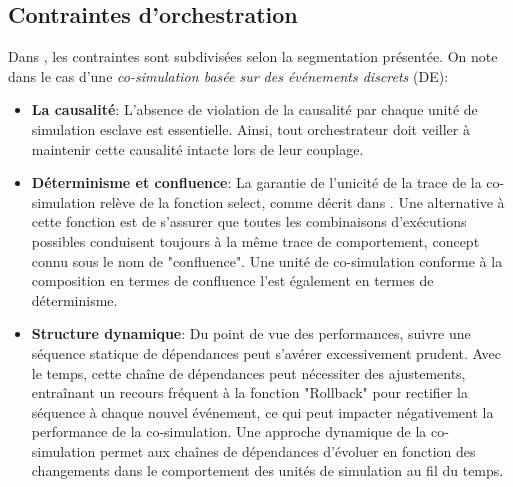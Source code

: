 \subsection{Contraintes d'orchestration}
Dans \cite{b7}, les contraintes sont subdivisées selon la segmentation présentée. On note dans le cas d'une \textit{co-simulation basée sur des événements discrets} (DE): 
\begin{itemize}
  \item \textbf{La causalité}:  L'absence de violation de la causalité par chaque unité de simulation esclave est essentielle. Ainsi, tout orchestrateur doit veiller à maintenir cette causalité intacte lors de leur couplage.
  \item \textbf{Déterminisme et confluence}: La garantie de l'unicité de la trace de la co-simulation relève de la fonction select, comme décrit dans \cite{b7}. Une alternative à cette fonction est de s'assurer que toutes les combinaisons d'exécutions possibles conduisent toujours à la même trace de comportement, concept connu sous le nom de "confluence". Une unité de co-simulation conforme à la composition en termes de confluence l'est également en termes de déterminisme.
  \item \textbf{Structure dynamique}: Du point de vue des performances, suivre une séquence statique de dépendances peut s'avérer excessivement prudent. Avec le temps, cette chaîne de dépendances peut nécessiter des ajustements, entraînant un recours fréquent à la fonction "Rollback" pour rectifier la séquence à chaque nouvel événement, ce qui peut impacter négativement la performance de la co-simulation. Une approche dynamique de la co-simulation permet aux chaînes de dépendances d'évoluer en fonction des changements dans le comportement des unités de simulation au fil du temps.\cite{b11}
\end{itemize}

